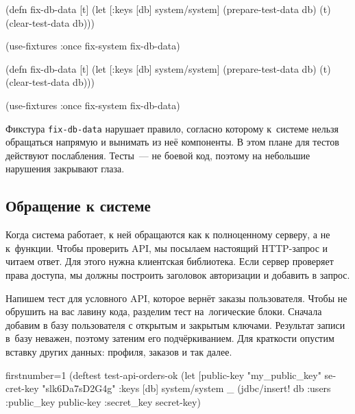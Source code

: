 \begin{english}
  \begin{clojure}
(defn fix-db-data
  [t]
  (let [{:keys [db]} system/system]
    (prepare-test-data db)
    (t)
    (clear-test-data db)))

(use-fixtures :once
  fix-system fix-db-data)
  \end{clojure}
\end{english}

\else

\begin{english}
  \begin{clojure}
(defn fix-db-data
  [t]
  (let [{:keys [db]} system/system]
    (prepare-test-data db)
    (t)
    (clear-test-data db)))

(use-fixtures :once fix-system fix-db-data)
  \end{clojure}
\end{english}

\fi

Фикстура \verb|fix-db-data| нарушает правило, согласно которому к~системе нельзя
обращаться напрямую и вынимать из неё компоненты. В этом плане для тестов
действуют послабления. Тесты~--- не боевой код, поэтому на небольшие нарушения
закрывают глаза.

\subsection{Обращение к системе}

Когда система работает, к ней обращаются как к полноценному серверу, а не к~функции.
Чтобы проверить API, мы посылаем настоящий HTTP-запрос и читаем
ответ. Для этого нужна клиентская библиотека. Если сервер проверяет права
доступа, мы должны построить заголовок авторизации и добавить в запрос.

Напишем тест для условного API, которое вернёт заказы пользователя. Чтобы не
обрушить на вас лавину кода, разделим тест на~логические блоки. Сначала добавим
в базу пользователя с открытым и закрытым ключами. Результат записи в~базу
неважен, поэтому затеним его подчёркиванием. Для краткости опустим вставку
других данных: профиля, заказов и так далее.

\begin{english}
  \begin{clojure/lines*}{firstnumber=1}
(deftest test-api-orders-ok
  (let [public-key "my_public_key"
        secret-key "slk6Da7sD2G4g"
        {:keys [db]} system/system
        _ (jdbc/insert! db :users
              {:public_key public-key
               :secret_key secret-key})
  \end{clojure/lines*}
\end{english}

